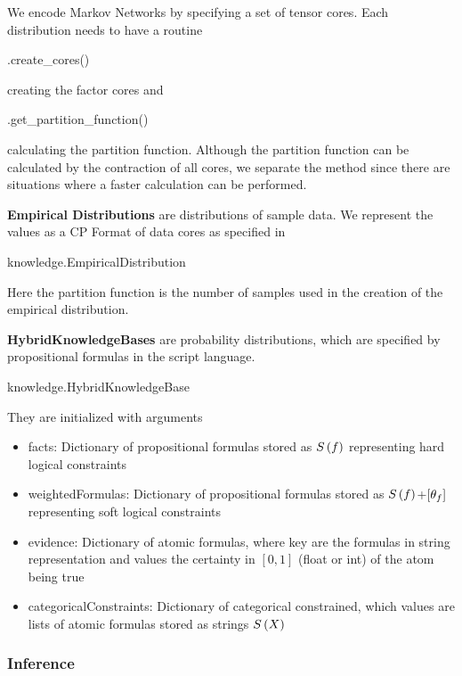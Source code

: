 We encode Markov Networks by specifying a set of tensor cores.
Each distribution needs to have a routine
\begin{centeredcode}
	.create\_cores()
\end{centeredcode}
creating the factor cores and 
\begin{centeredcode}
	.get\_partition\_function()
\end{centeredcode}
calculating the partition function.
Although the partition function can be calculated by the contraction of all cores, we separate the method since there are situations where a faster calculation can be performed.


\textbf{Empirical Distributions} are distributions of sample data.
We represent the values as a CP Format of data cores as specified in 
\begin{centeredcode}
	knowledge.EmpiricalDistribution
\end{centeredcode}
Here the partition function is the number of samples used in the creation of the empirical distribution.


\textbf{HybridKnowledgeBases} are probability distributions, which are specified by propositional formulas in the script language.
\begin{centeredcode}
	knowledge.HybridKnowledgeBase
\end{centeredcode}
They are initialized with arguments
\begin{itemize}
	\item facts: Dictionary of propositional formulas stored as $S\left(f\right)$ representing hard logical constraints
	\item weightedFormulas: Dictionary of propositional formulas stored as $S\left(f\right)$+$[\theta_{f}]$ representing soft logical constraints
	\item evidence: Dictionary of atomic formulas, where key are the formulas in string representation and values the certainty in $[0,1]$ (float or int) of the atom being true
	\item categoricalConstraints: Dictionary of categorical constrained, which values are lists of atomic formulas stored as strings $S\left(X\right)$
\end{itemize}


\subsubsection{Inference}

